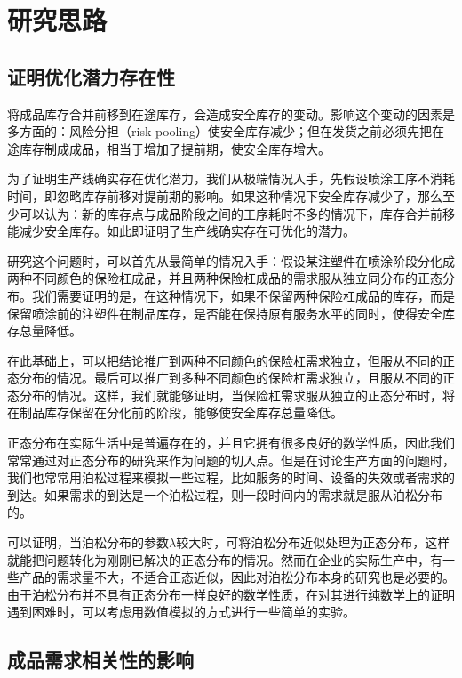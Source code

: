 \chapter{研究思路}

\section{证明优化潜力存在性}

将成品库存合并前移到在途库存，会造成安全库存的变动。影响这个变动的因素是多方面的：风险分担（risk pooling）使安全库存减少；但在发货之前必须先把在途库存制成成品，相当于增加了提前期，使安全库存增大。

为了证明生产线确实存在优化潜力，我们从极端情况入手，先假设喷涂工序不消耗时间，即忽略库存前移对提前期的影响。如果这种情况下安全库存减少了，那么至少可以认为：新的库存点与成品阶段之间的工序耗时不多的情况下，库存合并前移能减少安全库存。如此即证明了生产线确实存在可优化的潜力。

研究这个问题时，可以首先从最简单的情况入手：假设某注塑件在喷涂阶段分化成两种不同颜色的保险杠成品，并且两种保险杠成品的需求服从独立同分布的正态分布。我们需要证明的是，在这种情况下，如果不保留两种保险杠成品的库存，而是保留喷涂前的注塑件在制品库存，是否能在保持原有服务水平的同时，使得安全库存总量降低。

在此基础上，可以把结论推广到两种不同颜色的保险杠需求独立，但服从不同的正态分布的情况。最后可以推广到多种不同颜色的保险杠需求独立，且服从不同的正态分布的情况。这样，我们就能够证明，当保险杠需求服从独立的正态分布时，将在制品库存保留在分化前的阶段，能够使安全库存总量降低。

正态分布在实际生活中是普遍存在的，并且它拥有很多良好的数学性质，因此我们常常通过对正态分布的研究来作为问题的切入点。但是在讨论生产方面的问题时，我们也常常用泊松过程来模拟一些过程，比如服务的时间、设备的失效或者需求的到达。如果需求的到达是一个泊松过程，则一段时间内的需求就是服从泊松分布的。

可以证明，当泊松分布的参数$\lambda$较大时，可将泊松分布近似处理为正态分布，这样就能把问题转化为刚刚已解决的正态分布的情况。然而在企业的实际生产中，有一些产品的需求量不大，不适合正态近似，因此对泊松分布本身的研究也是必要的。由于泊松分布并不具有正态分布一样良好的数学性质，在对其进行纯数学上的证明遇到困难时，可以考虑用数值模拟的方式进行一些简单的实验。







\section{成品需求相关性的影响}


